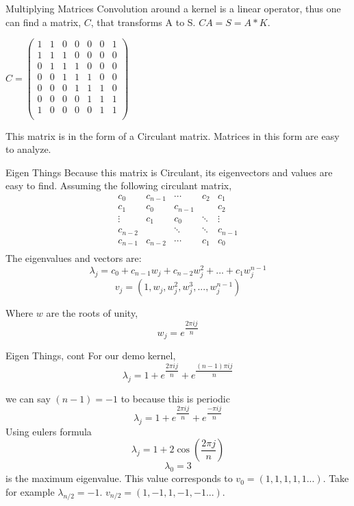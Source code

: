 \documentclass{beamer}
\begin{document}
\begin{frame}{Multiplying Matrices}
Convolution around a kernel is a linear operator, thus one can find a matrix, $C$, that transforms A to S. $CA=S=A*K$.

$C = \begin{pmatrix}
	1 & 1 & 0 & 0 & 0 & 0 & 1\\
	1 & 1 & 1 & 0 & 0 & 0 & 0\\
	0 & 1 & 1 & 1 & 0 & 0 & 0\\
	0 & 0 & 1 & 1 & 1 & 0 & 0\\
	0 & 0 & 0 & 1 & 1 & 1 & 0\\
	0 & 0 & 0 & 0 & 1 & 1 & 1\\
	1 & 0 & 0 & 0 & 0 & 1 & 1\\
\end{pmatrix}$

This matrix is in the form of a Circulant matrix. Matrices in this form are easy to analyze.

\end{frame}


\begin{frame}{Eigen Things}
Because this matrix is Circulant, its eigenvectors and values are easy to find. 
Assuming the following circulant matrix, 
$$\begin{matrix}
	c_0 & c_{n-1} & \cdots & c_2 & c_1\\
	c_1 & c_0 & c_{n-1} &  & c_2\\
	\vdots & c_1 & c_0 & \ddots & \vdots\\
	c_{n-2} &   & \ddots & \ddots & c_{n-1}\\
	c_{n-1} & c_{n-2} & \cdots & c_1 & c_0\\
\end{matrix}$$
The eigenvalues and vectors are:
$$\lambda_j =c_0+c_{n-1}w_j	+c_{n-2}w_j^2+...+c_{1}w_j^{n-1}$$
$$v_j = (1, w_j, w_j^2, w_j^3, ..., w_j^{n-1})$$

Where $w$ are the roots of unity,
$$w_j = e^{\dfrac{2\pi i j}{n}}$$

\end{frame}

\begin{frame}{Eigen Things, cont}
For our demo kernel,
$$\lambda_j = 1+e^{\dfrac{2\pi i j}{n}}+e^{\dfrac{(n-1)\pi i j}{n}}$$

we can say $(n-1) = -1$ to because this is periodic   
$$\lambda_j = 1+e^{\dfrac{2\pi i j}{n}}+e^{\dfrac{-\pi i j}{n}}$$
Using eulers formula
$$\lambda_j = 1+2\cos(\dfrac{2\pi j}{n})$$
$$\lambda_{0} = 3$$ is the maximum eigenvalue.
This value corresponds to $v_0 = (1,1,1,1,1...)$.
Take for example $\lambda_{n/2} = -1$.  $v_{n/2} = (1,-1,1,-1,-1...)$.

\end{frame}
\end{document}
